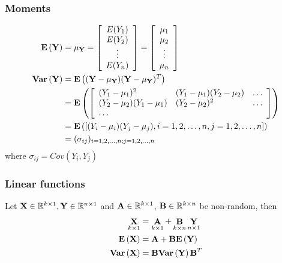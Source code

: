 \subsubsection*{Moments}
$$
\begin{aligned}
{\mathbf{E}\left(\mathbf{Y}\right)} &= \mathbf{\mu}_{\mathbf{Y}} = \left[ \begin{array}{c} E(Y_1)\\ E(Y_2)\\ \vdots\\ E(Y_n)\\ \end{array} \right]  = \left[ \begin{array}{c} \mu_1\\ \mu_2\\ \vdots\\ \mu_n\\ \end{array} \right]\\
\mathbf{Var}\left(\mathbf{Y}\right) 
&= {\mathbf{E}\left((\mathbf{Y} - \mathbf{\mu}_{\mathbf{Y}})(\mathbf{Y} - \mathbf{\mu}_{\mathbf{Y}})^T\right)}\\
&={\mathbf{E}\left( \left[ \begin{array}{lll} 
(Y_1 - \mu_1)^2 & (Y_1 - \mu_1)(Y_2 - \mu_2) & \dots\\ 
(Y_2 - \mu_2)(Y_1 - \mu_1) & (Y_2 - \mu_2)^2 & \dots\\
\dots & &\\
\end{array}\right]\right)}\\
&= {\mathbf{E}\left(\left[(Y_i - \mu_i)(Y_j - \mu_j), i = 1, 2, \dots, n, j = 1, 2, \dots, n \right]\right)}\\
&= (\sigma_{ij})_{i = 1, 2, \dots, n; j = 1, 2, \dots, n}
\end{aligned}
$$
where $\sigma_{ij} = Cov(Y_i, Y_j)$

\subsubsection*{Linear functions}
Let $\mathbf{X} \in \mathbb{R}^{k \times 1}, \mathbf{Y} \in \mathbb{R}^{n \times 1}$ and $\mathbf{A}  \in \mathbb{R}^{k \times 1}$, $\mathbf{B} \in \mathbb{R}^{k \times n}$ be non-random, then
$$
\begin{aligned}
\mathop \mathbf{X}\limits_{k \times 1} &= \mathop \mathbf{A}\limits_{k \times 1} + \mathop \mathbf{B}\limits_{k \times n} \mathop \mathbf{Y}\limits_{n \times 1}\\
{\mathbf{E}\left( \mathbf{X}\right)} &=  \mathbf{A} +  \mathbf{B} {\mathbf{E}\left(\mathbf{Y}\right)}\\
\mathbf{Var}\left(\mathbf{X}\right) &= \mathbf{B}\mathbf{Var}\left(\mathbf{Y}\right)\mathbf{B}^T\\
\end{aligned}
$$

